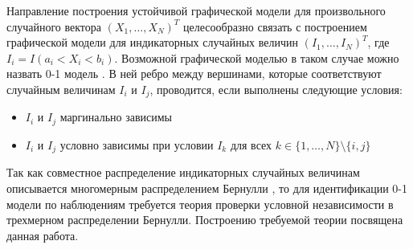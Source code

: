 Направление построения устойчивой графической модели
для произвольного случайного вектора $(X_1,\ldots,X_N)^T$
целесообразно связать с построением графической модели для
индикаторных случайных величин $(I_1,\ldots,I_N)^T$, где 
$I_i=I(a_i<X_i<b_i)$. 
Возможной графической моделью в таком случае можно назвать
0-1 модель \cite{low_order1}.
В ней ребро между вершинами, которые соответствуют
случайным величинам $I_i$ и $I_j$,
проводится, если выполнены следующие условия:
\begin{itemize}
    \item $I_i$ и $I_j$ маргинально зависимы
    \item $I_i$ и $I_j$ условно зависимы при условии $I_k$
    для всех $k\in \{1,\ldots,N\} \setminus \{i,j\}$
\end{itemize}
Так как совместное распределение индикаторных случайных величинам
описывается многомерным распределением Бернулли 
\cite{Dai2013, Teugels1990}, то
для идентификации 0-1 модели по наблюдениям требуется
теория проверки условной независимости в трехмерном распределении
Бернулли. Построению требуемой теории посвящена
данная работа.

